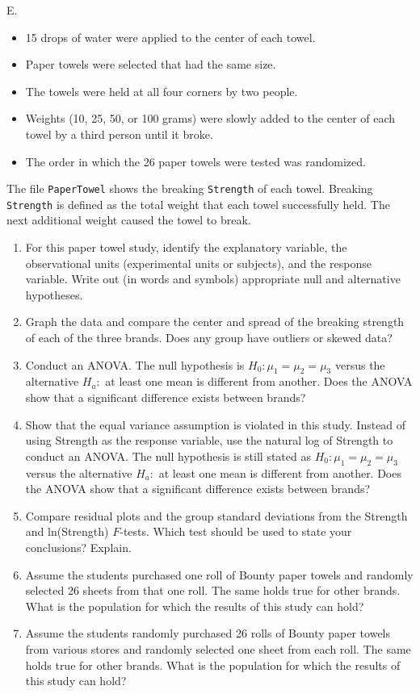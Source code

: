 \documentclass[
]{report}
\newcounter{excount}
\renewcommand{\theexcount}{E\arabic{excount}}
\begin{document}
\begin{list}{\theexcount.}{ \setlength{\itemsep}{1.2em}}
\begin{itemize}
  \item 15 drops of water were applied to the center of each towel.
  \item Paper towels were selected that had the same size.
  \item The towels were held at all four corners by two people.
  \item Weights (10, 25, 50, or 100 grams) were slowly added to the center of each towel by a third person until it broke.
  \item The order in which the 26 paper towels were tested was randomized.
\end{itemize}

The file \texttt{PaperTowel} shows the breaking \texttt{Strength} of each towel. Breaking \texttt{Strength} is defined as the total weight that each towel successfully held. The next additional weight caused the towel to break.

    \begin{enumerate}
      \item For this paper towel study, identify the explanatory variable, the observational units (experimental units or subjects), and the response variable. Write out (in words and symbols) appropriate null and alternative hypotheses.
      \item Graph the data and compare the center and spread of the breaking strength of each of the three brands. Does any group have outliers or skewed data?
      \item Conduct an ANOVA. The null hypothesis is $H_0\colon \mu_1 = \mu_2 = \mu_3$ versus the alternative $H_a\colon$ at least one mean is different from another. Does the ANOVA show that a significant difference exists between brands?
      \item Show that the equal variance assumption is violated in this study. Instead of using Strength as the response variable, use the natural log of Strength to conduct an ANOVA. The null hypothesis is still stated as $H_0\colon \mu_1 = \mu_2 = \mu_3$ versus the alternative $H_a\colon$ at least one mean is different from another. Does the ANOVA show that a significant difference exists between brands?
      \item Compare residual plots and the group standard deviations from the Strength and ln(Strength) $F$-tests. Which test should be used to state your conclusions? Explain.
      \item Assume the students purchased one roll of Bounty paper towels and randomly selected 26 sheets from that one roll. The same holds true for other brands. What is the population for which the results of this study can hold?
      \item Assume the students randomly purchased 26 rolls of Bounty paper towels from various stores and randomly selected one sheet from each roll. The same holds true for other brands. What is the population for which the results of this study can hold?
    \end{enumerate}


\end{list}
\end{document}
